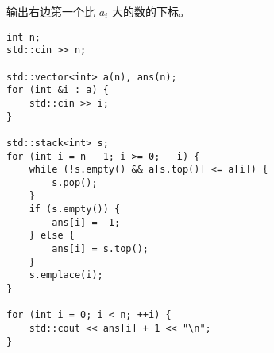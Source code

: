 输出右边第一个比 $a_i$ 大的数的下标。
\begin{lstlisting}
int n;
std::cin >> n;

std::vector<int> a(n), ans(n);
for (int &i : a) {
	std::cin >> i;
}

std::stack<int> s;
for (int i = n - 1; i >= 0; --i) {
	while (!s.empty() && a[s.top()] <= a[i]) {
		s.pop();
	}
	if (s.empty()) {
		ans[i] = -1;
	} else {
		ans[i] = s.top();
	}
	s.emplace(i);
}

for (int i = 0; i < n; ++i) {
	std::cout << ans[i] + 1 << "\n";
}
\end{lstlisting}